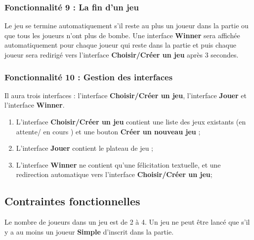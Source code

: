 \subsubsection{Fonctionnalité 9 : La fin d'un jeu}
Le jeu se termine automatiquement s'il reste au plus un joueur dans la partie ou que tous les joueurs n'ont plus de bombe. Une interface \textbf{Winner} sera affichée automatiquement pour chaque joueur qui reste dans la partie et puis chaque joueur sera redirigé vers l'interface \textbf{Choisir/Créer un jeu} après 3 secondes.
\subsubsection{Fonctionnalité 10 : Gestion des interfaces}
Il aura trois interfaces : l'interface \textbf{Choisir/Créer un jeu}, l'interface \textbf{Jouer} et l'interface \textbf{Winner}.
\begin{enumerate}
	\item L'interface \textbf{Choisir/Créer un jeu} contient une liste des jeux existants (en attente/ en cours ) et une bouton \textbf{Créer un nouveau jeu} ;
	\item L'interface \textbf{Jouer} contient le plateau de jeu ;
	\item L'interface \textbf{Winner} ne contient qu'une félicitation textuelle, et une redirection automatique vers l'interface \textbf{Choisir/Créer un jeu};
\end{enumerate}

\subsection{Contraintes fonctionnelles}
Le nombre de joueurs dans un jeu est de 2 à 4. Un jeu ne peut être lancé que s'il y a au moins un joueur \textbf{Simple} d'inscrit dans la partie.
